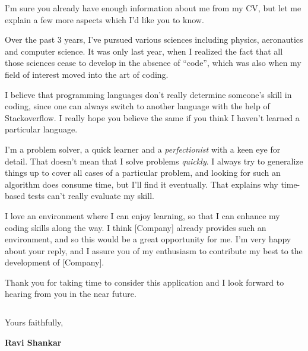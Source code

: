 \documentclass[11pt,a4paper,sans]{moderncv}        %
\begin{document}
\makelettertitle

I'm sure you already have enough information about me from my CV, but let me explain a few more aspects which I'd like you to know.

Over the past 3 years, I've pursued various sciences including physics, aeronautics and computer science. It was only last year, when I realized the fact that all those sciences cease to develop in the absence of ``code'', which was also when my field of interest moved into the art of coding.

I believe that programming languages don't really determine someone's skill in coding, since one can always switch to another language with the help of Stackoverflow. I really hope you believe the same if you think I haven't learned a particular language.

I'm a problem solver, a quick learner and a \textit{perfectionist} with a keen eye for detail. That doesn't mean that I solve problems \textit{quickly}. I always try to generalize things up to cover all cases of a particular problem, and looking for such an algorithm does consume time, but I'll find it eventually. That explains why time-based tests can't really evaluate my skill.

I love an environment where I can enjoy learning, so that I can enhance my coding skills along the way. I think [Company] already provides such an environment, and so this would be a great opportunity for me. I'm very happy about your reply, and I assure you of my enthusiasm to contribute my best to the development of [Company].

Thank you for taking time to consider this application and I look forward to hearing from you in the near future.

$\ $

Yours faithfully,

\textbf{Ravi Shankar}

\end{document}
